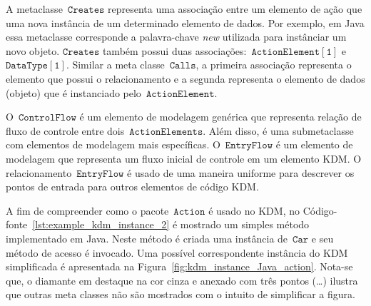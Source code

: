 A metaclasse~$\mathtt{Creates}$ representa uma associação entre um elemento de ação que  uma nova instância de um determinado elemento de dados. Por exemplo, em Java essa metaclasse corresponde a palavra-chave \textit{new} utilizada para instânciar um novo objeto. $\mathtt{Creates}$ também possui duas associações:~$\mathtt{ActionElement[1]}$ e~$\mathtt{DataType[1]}$. Similar a meta classe~$\mathtt{Calls}$, a primeira associação representa o elemento que possui o relacionamento e a segunda representa o elemento de dados (objeto) que é instanciado pelo~$\mathtt{ActionElement}$.


O~$\mathtt{ControlFlow}$ é um elemento de modelagem genérica que representa relação de fluxo de controle entre dois~$\mathtt{ActionElements}$. Além disso, é uma submetaclasse com elementos de modelagem mais específicas. O~$\mathtt{EntryFlow}$ é um elemento de modelagem que representa um fluxo inicial de controle em um elemento KDM. O relacionamento~$\mathtt{EntryFlow}$ é usado de uma maneira uniforme para descrever os pontos de entrada para outros elementos de código KDM.


A fim de compreender como o pacote~$\mathtt{Action}$ é usado no KDM, no Código-fonte~\ref{lst:example_kdm_instance_2} é mostrado um simples método implementado em Java. Neste método é criada uma instância de~$\mathtt{Car}$ e seu método de acesso é invocado. Uma possível correspondente instância do KDM simplificada é apresentada na Figura~\ref{fig:kdm_instance_Java_action}. Nota-se que, o diamante em destaque na cor cinza e anexado com três pontos (\ldots) ilustra que outras meta classes não são mostrados com o intuito de simplificar a figura.

